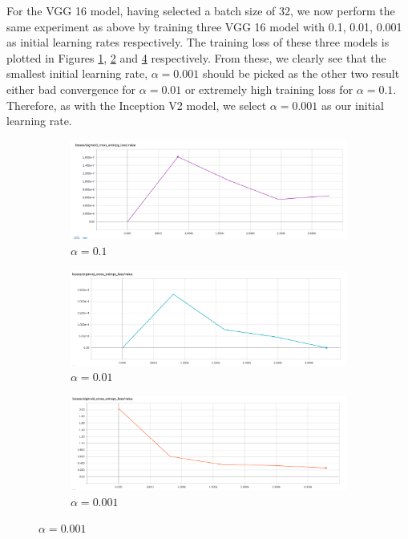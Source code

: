 \documentclass[12pt,twoside]{article}
\begin{document}
For the VGG 16 model, having selected a batch size of 32, we now perform the
same experiment as above by training three VGG 16 model with 0.1, 0.01, 0.001 as
initial learning rates respectively. The training loss of these three models is
plotted in Figures \ref{fig:learning_rate_01_11au_vgg16},
\ref{fig:learning_rate_001_11au_vgg16} and
\ref{fig:learning_rate_0001_11au_vgg16} respectively. From these, we clearly
see that the smallest initial learning rate, $\alpha = 0.001$ should be picked
as the other two result either bad convergence for $\alpha=0.01$ or extremely
high training loss for $\alpha=0.1$. Therefore, as with the Inception V2 model,
we select $\alpha=0.001$ as our initial learning rate.

\begin{figure}[ht]
  \begin{subfigure}[b]{1\textwidth}
    \centering
    \includegraphics[width=1\linewidth]{figures/learning_rate_01_11au_vgg16.png}
    \caption{$\alpha=0.1$}
    \label{fig:learning_rate_01_11au_vgg16}
  \end{subfigure}
  
  \begin{subfigure}[b]{1\textwidth}
    \centering
    \includegraphics[width=1\linewidth]{figures/learning_rate_001_11au_vgg16.png}
    \caption{$\alpha=0.01$}
    \label{fig:learning_rate_001_11au_vgg16}
  \end{subfigure}
  
  \begin{subfigure}[b]{1\textwidth}
    \centering
    \includegraphics[width=1\linewidth]{figures/learning_rate_0001_11au_vgg16.png}
    \caption{$\alpha = 0.001$}
    \label{fig:learning_rate_0001_11au_vgg16}
  \end{subfigure}


\end{figure}
\end{document}

